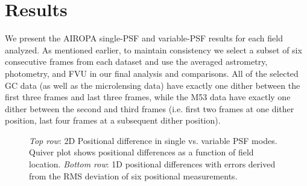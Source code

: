 \documentclass[]{spie}  %
\begin{document}

\section{Results} \label{sec:results}
We present the AIROPA single-PSF and variable-PSF results for each field analyzed. As mentioned earlier, to maintain consistency we select a subset of six consecutive frames from each dataset and use the averaged astrometry, photometry, and FVU in our final analysis and comparisons. All of the selected GC data (as well as the microlensing data) have exactly one dither between the first three frames and last three frames, while the M53 data have exactly one dither between the second and third frames (i.e. first two frames at one dither position, last four frames at a subsequent dither position).
\\
\begin{figure}[!h]
 \caption{\footnotesize \textit{Top row}: 2D Positional difference in single vs. variable PSF modes. Quiver plot shows positional differences as a function of field location. \textit{Bottom row}: 1D positional differences with errors derived from the RMS deviation of six positional measurements.} \label{fig:gc-gq-astrom}
\end{figure}
\end{document}
